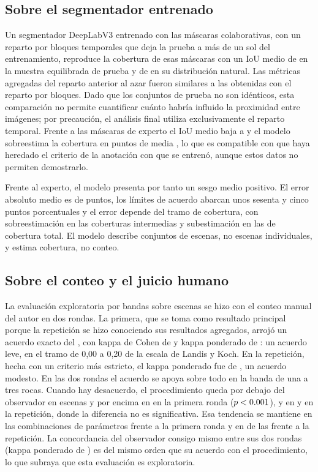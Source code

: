 \subsection{Sobre el segmentador entrenado}

Un segmentador DeepLabV3 entrenado con las máscaras colaborativas, con un reparto por bloques
temporales que deja la prueba a más de un sol del entrenamiento, reproduce la cobertura de esas
máscaras con un IoU medio de \cSegMIoU{} en la muestra equilibrada de prueba y de \cSegNatMIoU{}
en su distribución natural. Las métricas agregadas del reparto anterior al azar fueron
similares a las obtenidas con el reparto por bloques. Dado que los conjuntos de prueba no son
idénticos, esta comparación no permite cuantificar cuánto habría influido la proximidad entre
imágenes; por precaución, el análisis final utiliza exclusivamente el reparto temporal. Frente a
las máscaras de
experto el IoU medio baja a \cExpMIoU{} y el modelo sobreestima la cobertura en \cBAExpMedia{}
puntos de media \cBAExpMediaIC, lo que es compatible con que haya heredado el criterio de la
anotación con que se entrenó, aunque estos datos no permiten demostrarlo.

Frente al experto, el modelo presenta por tanto un sesgo medio positivo. El error absoluto medio es de
\cBAExpMAE{} puntos, los límites de acuerdo abarcan unos sesenta y cinco puntos porcentuales y el
error depende del tramo de cobertura, con sobreestimación en las coberturas intermedias y
subestimación en las de cobertura total. El modelo describe conjuntos de escenas, no escenas
individuales, y estima cobertura, no conteo.

\subsection{Sobre el conteo y el juicio humano}

La evaluación exploratoria por bandas sobre \cVN{} escenas se hizo con el conteo manual del
autor en dos rondas. La primera, que se toma como resultado principal porque la repetición se
hizo conociendo sus resultados agregados, arrojó un acuerdo exacto del \cVAcuerdo, con kappa de
Cohen de \cVKappa{} y kappa ponderado de \cVKappaPond: un acuerdo leve, en el tramo de 0,00 a
0,20 de la escala de Landis y Koch. En la repetición, hecha con un criterio más estricto, el
kappa ponderado fue de \cVSegKappaPond, un acuerdo modesto. En las dos rondas el acuerdo se apoya
sobre todo en la banda de una a tres rocas. Cuando hay desacuerdo, el procedimiento queda por
debajo del observador en \cVAbajo{} escenas y por encima en \cVArriba{} en la primera ronda
($p < \num{0.001}$), y en \cVSegAbajo{} y \cVSegArriba{} en la repetición, donde la diferencia no es
significativa. Esa tendencia se mantiene en las \cSenMasAbajo{} combinaciones de parámetros
frente a la primera ronda y en \cSenSegMasAbajo{} de las \cSenSegN{} frente a la repetición. La
concordancia del observador consigo mismo entre sus dos rondas (kappa ponderado de
\cVIntraKappaPond) es del mismo orden que su acuerdo con el procedimiento, lo que subraya que esta
evaluación es exploratoria.

